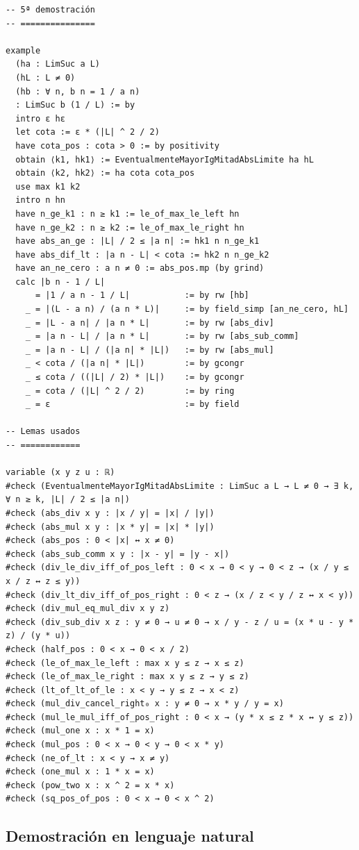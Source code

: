 \begin{verbatim}
-- 5ª demostración
-- ===============

example
  (ha : LimSuc a L)
  (hL : L ≠ 0)
  (hb : ∀ n, b n = 1 / a n)
  : LimSuc b (1 / L) := by
  intro ε hε
  let cota := ε * (|L| ^ 2 / 2)
  have cota_pos : cota > 0 := by positivity
  obtain ⟨k1, hk1⟩ := EventualmenteMayorIgMitadAbsLimite ha hL
  obtain ⟨k2, hk2⟩ := ha cota cota_pos
  use max k1 k2
  intro n hn
  have n_ge_k1 : n ≥ k1 := le_of_max_le_left hn
  have n_ge_k2 : n ≥ k2 := le_of_max_le_right hn
  have abs_an_ge : |L| / 2 ≤ |a n| := hk1 n n_ge_k1
  have abs_dif_lt : |a n - L| < cota := hk2 n n_ge_k2
  have an_ne_cero : a n ≠ 0 := abs_pos.mp (by grind)
  calc |b n - 1 / L|
      = |1 / a n - 1 / L|           := by rw [hb]
    _ = |(L - a n) / (a n * L)|     := by field_simp [an_ne_cero, hL]
    _ = |L - a n| / |a n * L|       := by rw [abs_div]
    _ = |a n - L| / |a n * L|       := by rw [abs_sub_comm]
    _ = |a n - L| / (|a n| * |L|)   := by rw [abs_mul]
    _ < cota / (|a n| * |L|)        := by gcongr
    _ ≤ cota / ((|L| / 2) * |L|)    := by gcongr
    _ = cota / (|L| ^ 2 / 2)        := by ring
    _ = ε                           := by field

-- Lemas usados
-- ============

variable (x y z u : ℝ)
#check (EventualmenteMayorIgMitadAbsLimite : LimSuc a L → L ≠ 0 → ∃ k, ∀ n ≥ k, |L| / 2 ≤ |a n|)
#check (abs_div x y : |x / y| = |x| / |y|)
#check (abs_mul x y : |x * y| = |x| * |y|)
#check (abs_pos : 0 < |x| ↔ x ≠ 0)
#check (abs_sub_comm x y : |x - y| = |y - x|)
#check (div_le_div_iff_of_pos_left : 0 < x → 0 < y → 0 < z → (x / y ≤ x / z ↔ z ≤ y))
#check (div_lt_div_iff_of_pos_right : 0 < z → (x / z < y / z ↔ x < y))
#check (div_mul_eq_mul_div x y z)
#check (div_sub_div x z : y ≠ 0 → u ≠ 0 → x / y - z / u = (x * u - y * z) / (y * u))
#check (half_pos : 0 < x → 0 < x / 2)
#check (le_of_max_le_left : max x y ≤ z → x ≤ z)
#check (le_of_max_le_right : max x y ≤ z → y ≤ z)
#check (lt_of_lt_of_le : x < y → y ≤ z → x < z)
#check (mul_div_cancel_right₀ x : y ≠ 0 → x * y / y = x)
#check (mul_le_mul_iff_of_pos_right : 0 < x → (y * x ≤ z * x ↔ y ≤ z))
#check (mul_one x : x * 1 = x)
#check (mul_pos : 0 < x → 0 < y → 0 < x * y)
#check (ne_of_lt : x < y → x ≠ y)
#check (one_mul x : 1 * x = x)
#check (pow_two x : x ^ 2 = x * x)
#check (sq_pos_of_pos : 0 < x → 0 < x ^ 2)
\end{verbatim}

\subsection{Demostración en lenguaje natural}

